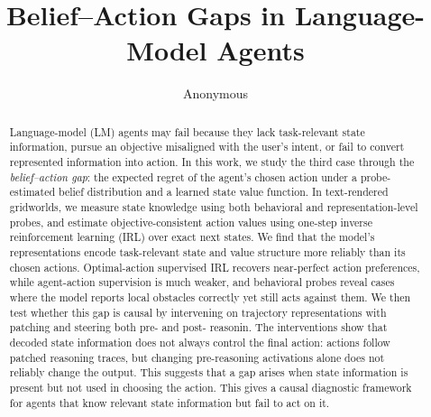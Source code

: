 \documentclass[10pt,twocolumn]{article}
\title{\textbf{Belief--Action Gaps in Language-Model Agents}}
\author{
Anonymous
}
\date{}
\begin{document}
\maketitle


\begin{abstract}
Language-model (LM) agents may fail because they lack task-relevant state information, pursue an objective misaligned with the user's intent, or fail to convert represented information into action. In this work, we study the third case through the \emph{belief--action gap}: the expected regret of the agent's chosen action under a probe-estimated belief distribution and a learned state value function. In text-rendered gridworlds, we measure state knowledge using both behavioral and representation-level probes, and estimate objective-consistent action values using one-step inverse reinforcement learning (IRL) over exact next states. We find that the model's representations encode task-relevant state and value structure more reliably than its chosen actions. Optimal-action supervised IRL recovers near-perfect action preferences, while agent-action supervision is much weaker, and behavioral probes reveal cases where the model reports local obstacles correctly yet still acts against them. We then test whether this gap is causal by intervening on trajectory representations with patching and steering both pre- and post- reasonin. The interventions show that decoded state information does not always control the final action: actions follow patched reasoning traces, but changing pre-reasoning activations alone does not reliably change the output. This suggests that a gap arises when state information is present but not used in choosing the action. This gives a causal diagnostic framework for agents that know relevant state information but fail to act on it.
\end{abstract}
\end{document}
